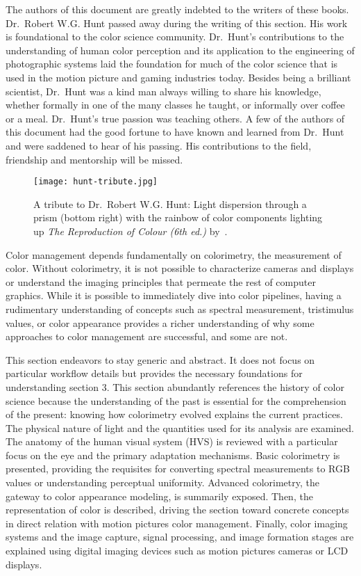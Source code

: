 The authors of this document are greatly indebted to the writers of these
books.
\ccpar{}
Dr.~Robert W.G. Hunt passed away during the writing of this section. His work
is foundational to the color science community. Dr.~Hunt’s contributions to the
understanding of human color perception and its application to the engineering
of photographic systems laid the foundation for much of the color science that
is used in the motion picture and gaming industries today. Besides being a
brilliant scientist, Dr.~Hunt was a kind man always willing to share his
knowledge, whether formally in one of the many classes he taught, or informally
over coffee or a meal. Dr.~Hunt’s true passion was teaching others. A few of
the authors of this document had the good fortune to have known and learned
from Dr.~Hunt and were saddened to hear of his passing. His contributions to
the field, friendship and mentorship will be missed.

\begin{figure}[H]
    \texttt{[image: hunt-tribute.jpg]}
    \caption{
        A tribute to Dr.~Robert W.G. Hunt: Light dispersion through a prism
        (bottom right) with the rainbow of color components lighting up
        \textit{The Reproduction of Colour (6th ed.)} by~\textcite{Hunt2004b}.
    }%
    \label{fig:hunt-tribute}
\end{figure}

Color management depends fundamentally on colorimetry, the measurement of color. Without colorimetry, it is not possible to characterize cameras and displays or understand the imaging principles that permeate the rest of computer graphics. While it is possible to immediately dive into color pipelines, having a rudimentary understanding of concepts such as spectral measurement, tristimulus values, or color appearance provides a richer understanding of why some approaches to color management are successful, and some are not.

This section endeavors to stay generic and abstract. It does not focus on particular workflow details but provides the necessary foundations for understanding section 3. This section abundantly references the history of color science because the understanding of the past is essential for the comprehension of the present: knowing how colorimetry evolved explains the current practices. The physical nature of light and the quantities used for its analysis are examined. The anatomy of the human visual system (HVS) is reviewed with a particular focus on the eye and the primary adaptation mechanisms. Basic colorimetry is presented, providing the requisites for converting spectral measurements to RGB values or understanding perceptual uniformity. Advanced colorimetry, the gateway to color appearance modeling, is summarily exposed. Then, the representation of color is described, driving the section toward concrete concepts in direct relation with motion pictures color management. Finally, color imaging systems and the image capture, signal processing, and image formation stages are explained using digital imaging devices such as motion pictures cameras or LCD displays.

